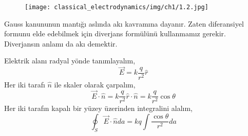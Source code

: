 \begin{figure}[h!]
\centering
\texttt{[image: classical\_electrodynamics/img/ch1/1.2.jpg]}
\caption{}
\end{figure}  

\newpage

\begin{tcolorbox}
Gauss kanununun mantığı aslında akı kavramına dayanır. Zaten diferansiyel formunu elde edebilmek için diverjans formülünü kullanmamız gerekir. Diverjansın anlamı da akı demektir.
\end{tcolorbox}
\begin{theorem}
Elektrik alanı radyal yönde tanımlayalım,
\[ \Vec{E} = k \dfrac{q}{r^{2}} \hat{r}  \]
Her iki tarafı $\hat{n}$ ile skaler olarak çarpalım,
\[ \Vec{E} \cdot \hat{n} = k  \dfrac{q }{r^{2}} \hat{r} \cdot \hat{n} = k \dfrac{q}{r^{2}} \cos \theta \]
Her iki tarafın kapalı bir yüzey üzerinden integralini alalım,
\[ \oint_{S} \Vec{E} \cdot \hat{n} da = kq \int \dfrac{\cos \theta}{r^{2}} da \]


\begin{figure}[H]
\centering


\begin{tikzpicture}[x=0.75pt,y=0.75pt,yscale=-1,xscale=1]
\centering


\end{tikzpicture}
\end{figure}
\end{theorem}
